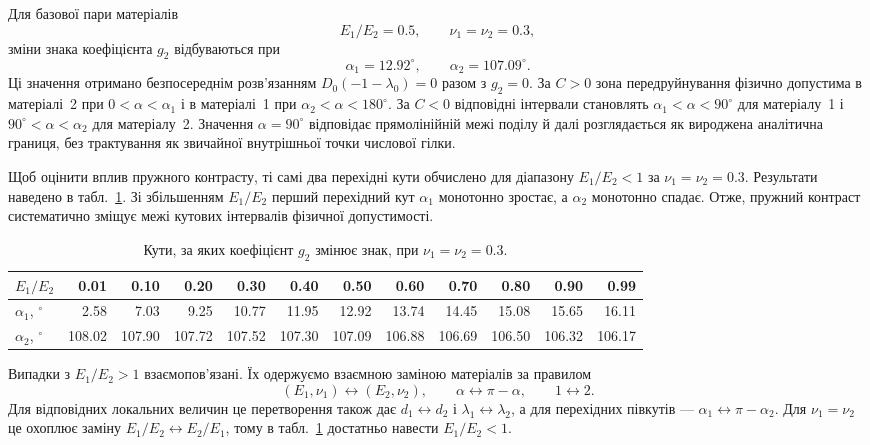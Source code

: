 Для базової пари матеріалів
\begin{equation*}
  E_1/E_2=0.5,\qquad \nu_1=\nu_2=0.3,
\end{equation*}
зміни знака коефіцієнта $g_2$ відбуваються при
\begin{equation*}
  \alpha_1=12.92^\circ,\qquad
  \alpha_2=107.09^\circ.
\end{equation*}
Ці значення отримано безпосереднім розв’язанням $D_0(-1-\lambda_0)=0$ разом з $g_2=0$. За $C>0$ зона передруйнування фізично допустима в матеріалі~2 при $0<\alpha<\alpha_1$ і в матеріалі~1 при $\alpha_2<\alpha<180^\circ$. За $C<0$ відповідні інтервали становлять $\alpha_1<\alpha<90^\circ$ для матеріалу~1 і $90^\circ<\alpha<\alpha_2$ для матеріалу~2. Значення $\alpha=90^\circ$ відповідає прямолінійній межі поділу й далі розглядається як вироджена аналітична границя, без трактування як звичайної внутрішньої точки числової гілки.

Щоб оцінити вплив пружного контрасту, ті самі два перехідні кути обчислено для діапазону $E_1/E_2<1$ за $\nu_1=\nu_2=0.3$. Результати наведено в табл.~\ref{tab:g2-transition-angles}. Зі збільшенням $E_1/E_2$ перший перехідний кут $\alpha_1$ монотонно зростає, а $\alpha_2$ монотонно спадає. Отже, пружний контраст систематично зміщує межі кутових інтервалів фізичної допустимості.

\begin{table}[htbp]
\centering
\caption{Кути, за яких коефіцієнт $g_2$ змінює знак, при $\nu_1=\nu_2=0.3$.}
\label{tab:g2-transition-angles}
\scriptsize
\setlength{\tabcolsep}{2.6pt}
\begin{tabular}{@{}lrrrrrrrrrrr@{}}
\toprule
$E_1/E_2$ & 0.01 & 0.10 & 0.20 & 0.30 & 0.40 & 0.50 & 0.60 & 0.70 & 0.80 & 0.90 & 0.99 \\
\midrule
$\alpha_1$, $^\circ$ & 2.58 & 7.03 & 9.25 & 10.77 & 11.95 & 12.92 & 13.74 & 14.45 & 15.08 & 15.65 & 16.11 \\
$\alpha_2$, $^\circ$ & 108.02 & 107.90 & 107.72 & 107.52 & 107.30 & 107.09 & 106.88 & 106.69 & 106.50 & 106.32 & 106.17 \\
\bottomrule
\end{tabular}
\end{table}

Випадки з $E_1/E_2>1$ взаємопов’язані. Їх одержуємо взаємною заміною матеріалів за правилом
\begin{equation*}
  (E_1,\nu_1)\leftrightarrow(E_2,\nu_2),
  \qquad
  \alpha\leftrightarrow\pi-\alpha,
  \qquad
  1\leftrightarrow2.
\end{equation*}
Для відповідних локальних величин це перетворення також дає $d_1\leftrightarrow d_2$ і $\lambda_1\leftrightarrow\lambda_2$, а для перехідних півкутів — $\alpha_1\leftrightarrow\pi-\alpha_2$. Для $\nu_1=\nu_2$ це охоплює заміну $E_1/E_2\leftrightarrow E_2/E_1$, тому в табл.~\ref{tab:g2-transition-angles} достатньо навести $E_1/E_2<1$.

